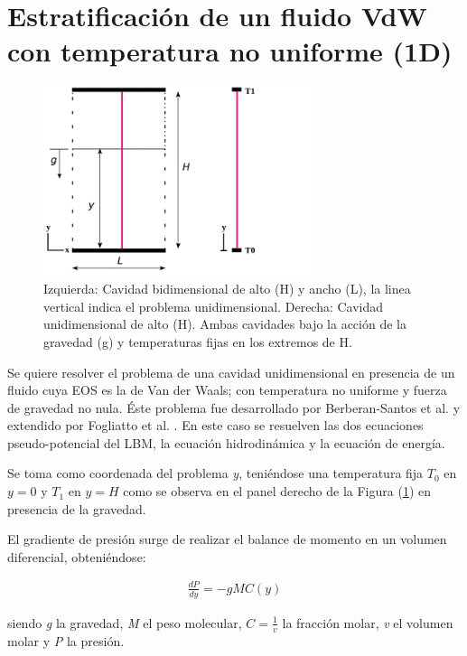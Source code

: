 \newpage

\section{Estratificación de un fluido VdW con temperatura no uniforme (1D)}

\begin{figure}[htbp]
	\centering
	\includegraphics[width=0.7\textwidth]{figs/cap4/esquema_problema_VdW}
	\caption{Izquierda: Cavidad bidimensional de alto (H) y ancho (L), la linea vertical indica el problema unidimensional. Derecha: Cavidad unidimensional de alto (H). Ambas cavidades bajo la acción de la gravedad (g) y temperaturas fijas en los extremos de H.} 
	\label{fig:esquema_VdW}	
\end{figure}

Se quiere resolver el problema de una cavidad unidimensional en presencia de un fluido cuya EOS es la de Van der Waals; con temperatura  no uniforme y fuerza de gravedad no nula. Éste problema fue desarrollado por Berberan-Santos et al. \cite{berberan2002liquid} y extendido por Fogliatto et al. \cite{fogliatto2019simulation}. En este caso se resuelven las dos ecuaciones pseudo-potencial del LBM, la ecuación hidrodinámica y la ecuación de energía.

Se toma como coordenada del problema \textit{y}, teniéndose una temperatura fija $T_{0}$ en $y = 0$ y $T_{1}$ en $y = H$ como se observa en el panel derecho de la Figura (\ref{fig:esquema_VdW}) en presencia de la gravedad.

El gradiente de presión surge de realizar el balance de momento en un volumen diferencial, obteniéndose:

\begin{align}
	\frac{d P}{d y} = - g M C(y)
\end{align}

siendo \textit{g} la gravedad, \textit{M} el peso molecular, $C = \frac{1}{v}$ la fracción molar, \textit{v} el volumen molar y \textit{P} la presión.


